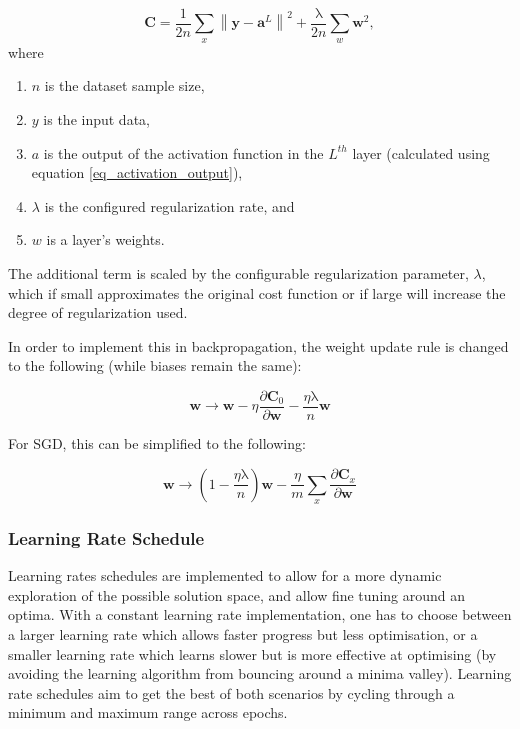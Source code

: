 \documentclass[a4paper,11pt,oneside]{article}
\theoremstyle{plain}
\theoremstyle{definition}
\begin{document}
	\begin{equation}\label{func_l2reg}
	\mathbf{C}=\frac{1}{2 n} \sum_{x}\left\|\mathbf{y}-\mathbf{a}^{L}\right\|^{2}+\frac{\mathrm{\lambda}}{2 n} \sum_{w} \mathbf{w}^{2},
	\end{equation}
	where
	\begin{enumerate}
		\item $n$ is the dataset sample size,
		\item $y$ is the input data,
		\item $a$ is the output of the activation function in the $L^{th}$ layer (calculated using equation \eqref{eq_activation_output}),
		\item $\lambda$ is the configured regularization rate, and
		\item $w$ is a layer's weights.
	\end{enumerate}
	
	The additional term is scaled by the configurable regularization parameter, $\lambda$, which if small approximates the original cost function or if large will increase the degree of regularization used. \newline
	
	In order to implement this in backpropagation, the weight update rule is changed to the following (while biases remain the same):
	
	\begin{equation}\label{func_l2_weight_update}
	\mathbf{w} \rightarrow \mathbf{w}-\eta \frac{\partial \mathbf{C}_{0}}{\partial \mathbf{w}}-\frac{\eta \mathrm{\lambda}}{n} \mathbf{w}
	\end{equation}
	
	For SGD, this can be simplified to the following: 
	
	\begin{equation}\label{func_sgd_l2}
	\mathbf{w} \rightarrow\left(1-\frac{\eta \mathrm{\lambda}}{n}\right) \mathbf{w}-\frac{\eta}{m} \sum_{x} \frac{\partial \mathbf{C}_{x}}{\partial \mathbf{w}}
	\end{equation}
	
	
	\subsubsection{Learning Rate Schedule}\label{imp_learning_rate_schedule}
	
	Learning rates schedules are implemented to allow for a more dynamic exploration of the possible solution space, and allow fine tuning around an optima. With a constant learning rate implementation, one has to choose between a larger learning rate which allows faster progress but less optimisation, or a smaller learning rate which learns slower but is more effective at optimising (by avoiding the learning algorithm from bouncing around a minima valley). Learning rate schedules aim to get the best of both scenarios by cycling through a minimum and maximum range across epochs.\newline
	
\end{document}
